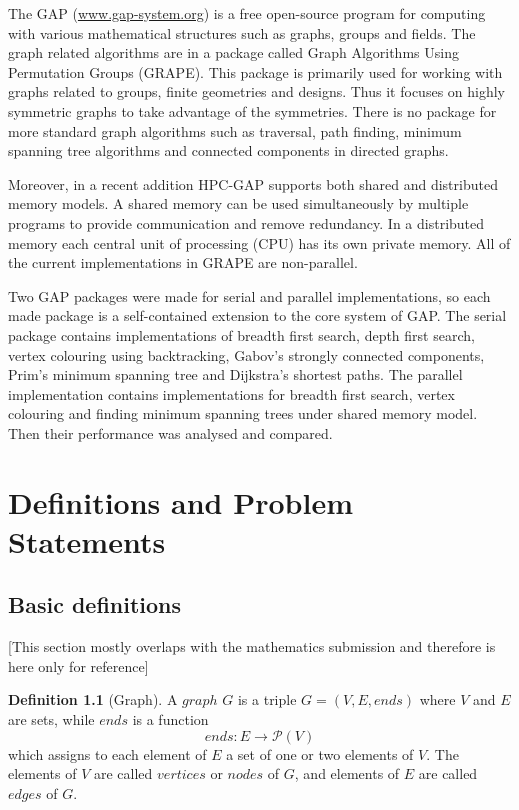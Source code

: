 \documentclass{report}
\theoremstyle{plain}
\theoremstyle{definition}
\newtheorem{definition}{Definition}
\theoremstyle{remark}
\begin{document}
The GAP (\url{www.gap-system.org}) is a free open-source program for computing with various mathematical structures such as graphs, groups and fields. The graph related algorithms are in a package called Graph Algorithms Using Permutation Groups (GRAPE). This package is primarily used for working with graphs related to groups, finite geometries and designs. Thus it focuses on highly symmetric graphs to take advantage of the symmetries. There is no package for more standard graph algorithms such as traversal, path finding, minimum spanning tree algorithms and connected components in directed graphs.

Moreover, in a recent addition HPC-GAP supports both shared and distributed memory models. A shared memory can be used simultaneously by multiple programs to provide communication and remove redundancy. In a distributed memory each central unit of processing (CPU) has its own private memory. All of the current implementations in GRAPE are non-parallel.

Two GAP packages were made for serial and parallel implementations, so each made package is a self-contained extension to the core system of GAP. The serial package contains implementations of breadth first search, depth first search, vertex colouring using backtracking, Gabov's strongly connected components, Prim's minimum spanning tree and Dijkstra's shortest paths. The parallel implementation contains implementations for breadth first search, vertex colouring and finding minimum spanning trees under shared memory model. Then their performance was analysed and compared.

\chapter{Definitions and Problem Statements}

\section*{Basic definitions}

[This section mostly overlaps with the mathematics submission and therefore is here only for reference]

\begin{definition}[Graph]
A $graph$  $G$ is a triple $G = (V, E, ends)$ where $V$ and $E$ are sets, while $ends$ is a function 
  \begin{equation}
  ends:E\to \mathcal P \left({V}\right)
  \end{equation}
which assigns to each element of $E$ a set of one or two elements of $V$. The elements of $V$ are called $vertices$ or $nodes$ of $G$, and elements of $E$ are called $edges$ of $G$.
\end{definition}
\end{document}
